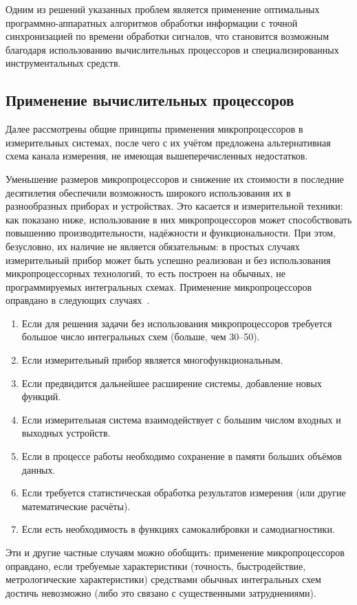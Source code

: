 \documentclass[a4paper, 14pt, titlepage]{extarticle}
\begin{document}
  Одним из решений указанных проблем является применение оптимальных программно-аппаратных
  алгоритмов обработки информации с точной синхронизацией по времени  обработки сигналов,
  что становится возможным благодаря использованию вычислительных процессоров и специализированных инструментальных средств.

  \subsection{Применение вычислительных процессоров}

  Далее рассмотрены общие принципы применения микропроцессоров в измерительных системах, после чего
  с их учётом предложена альтернативная схема канала измерения, не имеющая вышеперечисленных недостатков.

  Уменьшение размеров микропроцессоров и снижение их стоимости в последние десятилетия обеспечили
  возможность широкого использования их в разнообразных приборах и устройствах. Это касается и
  измерительной техники: как показано ниже, использование в них микропроцессоров может
  способствовать повышению производительности, надёжности и функциональности. При этом, безусловно,
  их наличие не является обязательным: в простых случаях измерительный прибор может быть успешно реализован
  и без использования микропроцессорных технологий, то есть построен на обычных, не программируемых
  интегральных схемах. Применение микропроцессоров оправдано в следующих случаях~\cite[с.~241]{rannev-meas-tech}.
  \begin{enumerate}
    \item Если для решения задачи без использования микропроцессоров требуется большое число интегральных
      схем (больше, чем 30--50).
    \item Если измерительный прибор является многофункциональным.
    \item Если предвидится дальнейшее расширение системы, добавление новых функций.
    \item Если измерительная система взаимодействует с большим числом входных и выходных устройств.
    \item Если в процессе работы необходимо сохранение в памяти больших объёмов данных.
    \item Если требуется статистическая обработка результатов измерения (или другие математические расчёты).
    \item Если есть необходимость в функциях самокалибровки и самодиагностики.
  \end{enumerate}
  Эти и другие частные случаям можно обобщить: применение микропроцессоров оправдано, если требуемые
  характеристики (точность, быстродействие, метрологические характеристики) средствами обычных
  интегральных схем достичь невозможно (либо это связано с существенными затруднениями).
\end{document}
